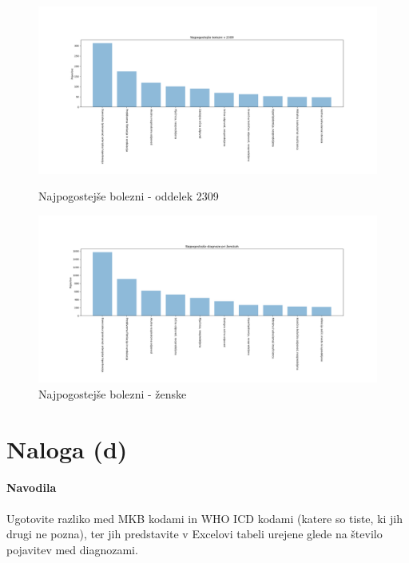 \documentclass[a4paper,12pt]{report}
\begin{document}
\begin{center}
   \begin{figure}[!htb]
      \centering
         \begin{minipage}[b]{0.4\textwidth}
            \noindent\includegraphics[width=\linewidth]{./grafi/2309.png}
            \caption{Najpogostejše bolezni - oddelek 2309}
         \end{minipage}
         \hfill
         \begin{minipage}[b]{0.4\textwidth}
            \noindent\includegraphics[width=\linewidth]{./grafi/zenske.png}
            \caption{Najpogostejše bolezni - ženske}
         \end{minipage}
   \end{figure}

\end{center}

\section*{Naloga (d)}
\paragraph{Navodila}
Ugotovite razliko med MKB kodami in WHO ICD kodami (katere so tiste, ki jih drugi ne pozna), ter jih predstavite v Excelovi tabeli urejene glede na število pojavitev med diagnozami.
\end{document}
